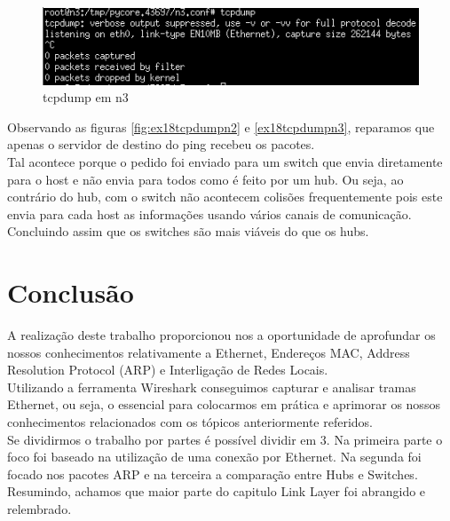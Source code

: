 \documentclass[a4paper]{report}
\begin{document}
\begin{figure}[H]
    \centering 
    \includegraphics[width=\textwidth]{images/ex18tcpdumpn3.png}
    \caption{tcpdump em n3}
    \label{fig:ex18tcpdumpn3}
\end{figure}
Observando as figuras \ref{fig:ex18tcpdumpn2} e \ref{ex18tcpdumpn3}, reparamos
que apenas o servidor de destino do ping recebeu os pacotes.\\
Tal acontece porque o pedido foi enviado para um switch que envia diretamente
para o host e não envia para todos como é feito por um hub. Ou seja, ao
contrário do hub, com o switch não acontecem colisões frequentemente pois este
envia para cada host as informações usando vários canais de comunicação.\\
Concluindo assim que os switches são mais viáveis do que os hubs.

\chapter{Conclusão}
A realização deste trabalho proporcionou nos a oportunidade de aprofundar os
nossos conhecimentos relativamente a Ethernet, Endereços MAC, Address Resolution
Protocol (ARP) e Interligação de Redes Locais.\\
Utilizando a ferramenta Wireshark conseguimos capturar e analisar tramas
Ethernet, ou seja, o essencial para colocarmos em prática e aprimorar os nossos
conhecimentos relacionados com os tópicos anteriormente referidos.\\
Se dividirmos o trabalho por partes é possível dividir em 3. Na primeira parte o
foco foi baseado na utilização de uma conexão por Ethernet. Na segunda foi
focado nos pacotes ARP e na terceira a comparação entre Hubs e Switches.
Resumindo, achamos que maior parte do capitulo Link Layer foi abrangido e
relembrado.
\end{document}
